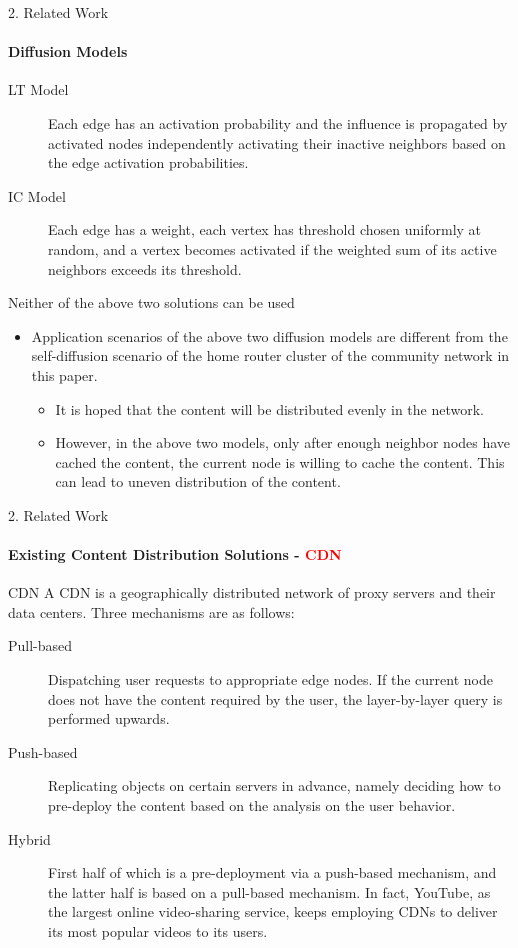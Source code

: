 \documentclass{beamer}		%
\begin{document}
\begin{frame}{2. Related Work}
\framesubtitle{Diffusion Models}
\begin{description}
\item[LT Model] Each edge has an activation probability and the influence is propagated by activated nodes independently activating their inactive neighbors based on the edge activation probabilities. 
\end{description}
\begin{description}
\item[IC Model] Each edge has a weight, each vertex has threshold chosen uniformly at random, and a vertex becomes activated if the weighted sum of its active neighbors exceeds its threshold.
\end{description}
\begin{block}{Neither of the above two solutions can be used}
\begin{itemize}
    \item Application scenarios of the above two diffusion models are different from the self-diffusion scenario of the home router cluster of the community network in this paper.
    \begin{itemize}
        \item It is hoped that the content will be distributed evenly in the network.
        \item However, in the above two models, only after enough neighbor nodes have cached the content, the current node is willing to cache the content. This can lead to uneven distribution of the content. 
    \end{itemize}
\end{itemize}
\end{block}
\end{frame}

\begin{frame}{2. Related Work}
\framesubtitle{Existing Content Distribution Solutions - \textcolor{red}{CDN}}
\begin{block}{CDN}
A CDN is a geographically distributed network of proxy servers and their data centers.
Three mechanisms are as follows:
\end{block}
\begin{description}
    \item[Pull-based] Dispatching user requests to appropriate edge nodes. If the current node does not have the content required by the user, the layer-by-layer query is performed upwards. 
    \item[Push-based] Replicating objects on certain servers in advance, namely deciding how to pre-deploy the content based on the analysis on the user behavior.
    \item[Hybrid] First half of which is a pre-deployment via a push-based mechanism, and the latter half is based on a pull-based mechanism. In fact, YouTube, as the largest online video-sharing service, keeps employing CDNs to deliver its most popular videos to its users.
\end{description}
\end{frame}
\end{document}
